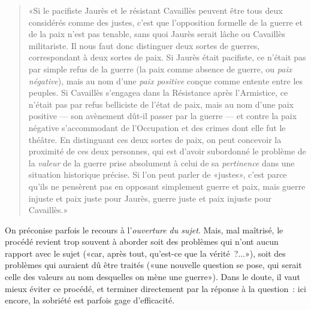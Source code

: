 \documentclass[a4paper,11pt]{article}
\begin{document}
\begin{quote}
  «Si le pacifiste Jaurès et le résistant Cavaillès peuvent être tous
  deux considérés comme des justes, c'est que l'opposition formelle de
  la guerre et de la paix n'est pas tenable, sans quoi Jaurès serait
  lâche ou Cavaillès militariste. Il nous faut donc distinguer deux
  sortes de guerres, correspondant à deux sortes de paix. Si Jaurès
  était pacifiste, ce n'était pas par simple refus de la guerre (la paix
  comme absence de guerre, ou \emph{paix négative}), mais au nom d'une
  \emph{paix positive} conçue comme entente entre les peuples. Si
  Cavaillès s'engagea dans la Résistance après l'Armistice, ce n'était
  pas par refus belliciste de l'état de paix, mais au nom d'une paix
  positive --- son avènement dût-il passer par la guerre --- et contre
  la paix négative s'accommodant de l'Occupation et des crimes dont elle
  fut le théâtre. En distinguant ces deux sortes de paix, on peut
  concevoir la proximité de ces deux personnes, qui est d'avoir
  subordonné le problème de la \emph{valeur} de la guerre prise
  absolument à celui de sa \emph{pertinence} dans une situation
  historique précise. Si l'on peut parler de «justes», c'est parce
  qu'ils ne pensèrent pas en opposant simplement guerre et paix, mais
  guerre injuste et paix juste pour Jaurès, guerre juste et paix injuste
  pour Cavaillès.»
\end{quote}

\par

On préconise parfois le recours à l'\emph{ouverture du sujet}. Mais, mal
maîtrisé, le procédé revient trop souvent à aborder soit des problèmes
qui n'ont aucun rapport avec le sujet («car, après tout, qu'est-ce que
la vérité~?...»), soit des problèmes qui auraient dû être traités («une
nouvelle question se pose, qui serait celle des valeurs au nom
desquelles on mène une guerre»). Dans le doute, il vaut mieux éviter ce
procédé, et terminer directement par la réponse à la question~: ici
encore, la sobriété est parfois gage d'efficacité.


\end{document}
